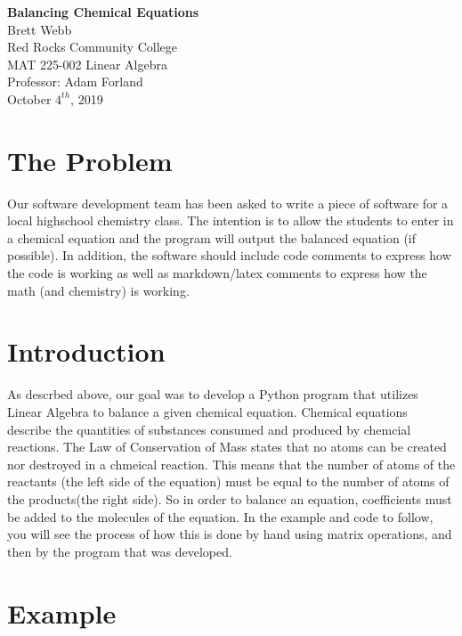 \documentclass[10pt]{article}
\begin{document}
\begin{center}
{\huge \bf Balancing Chemical Equations} \\
\vspace*{.5cm}
{\large Brett Webb \\
Red Rocks Community College \\
MAT 225-002 Linear Algebra \\
Professor: Adam Forland \\
\vspace*{.5cm}
October $4^{th}$, 2019} 
\end{center}

\section*{The Problem}
Our software development team has been asked to write a piece of software for a local highschool chemistry class.
The intention is to allow the students to enter in a chemical equation and the program will output the balanced 
equation (if possible). In addition, the software should include code comments to express how the code is working
as well as markdown/latex comments to express how the math (and chemistry) is working.

\section{Introduction}
As descrbed above, our goal was to develop a Python program that utilizes Linear Algebra to balance a given chemical
equation. Chemical equations describe the quantities of substances consumed and produced by chemcial reactions. The 
Law of Conservation of Mass states that no atoms can be created nor destroyed in a chmeical reaction. This means that
the number of atoms of the reactants (the left side of the equation) must be equal to the number of atoms of the
products(the right side). So in order to balance an equation, coefficients must be added to the molecules of the equation.
In the example and code to follow, you will see the process of how this is done by hand using matrix operations, and then
by the program that was developed.


\section{Example}
\end{document}
